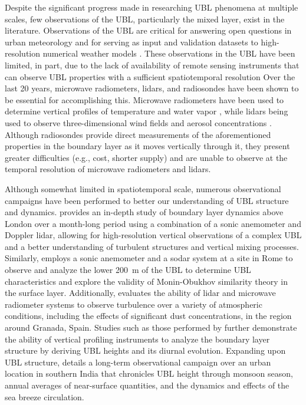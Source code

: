 \documentclass[11pt,a4paper]{article}
\begin{document}
Despite the significant progress made in researching UBL phenomena at multiple scales, few observations of the UBL, particularly the mixed layer, exist in the literature. Observations of the UBL are critical for answering open questions in urban meteorology and for serving as input and validation datasets to high-resolution numerical weather models \citep{barlow2014, best2005, edwards2020, leroyer2014, ronda2017}. These observations in the UBL have been limited, in part, due to the lack of availability of remote sensing instruments that can observe UBL properties with a sufficient spatiotemporal resolution \citep{barlow2014, davis2021, roth2000, zhang2020} Over the last 20 years, microwave radiometers, lidars, and radiosondes have been shown to be essential for accomplishing this. Microwave radiometers have been used to determine vertical profiles of temperature and water vapor \citep{rose2005, wang2012}, while lidars being used to observe three-dimensional wind fields and aerosol concentrations \citep{grund2001}. Although radiosondes provide direct measurements of the aforementioned properties in the boundary layer as it moves vertically through it, they present greater difficulties (e.g., cost, shorter supply) and are unable to observe at the temporal resolution of microwave radiometers and lidars. 

Although somewhat limited in spatiotemporal scale, numerous observational campaigns have been performed to better our understanding of UBL structure and dynamics. \citet{barlow2011} provides an in-depth study of boundary layer dynamics above London over a month-long period using a combination of a sonic anemometer and Doppler lidar, allowing for high-resolution vertical observations of a complex UBL and a better understanding of turbulent structures and vertical mixing processes. Similarly, \citet{pelliccioni2012} employs a sonic anemometer and a sodar system at a site in Rome to observe and analyze the lower \SI{200}{\meter} of the UBL to determine UBL characteristics and explore the validity of Monin-Obukhov similarity theory in the surface layer. Additionally, \citet{dearrudamoreira2020} evaluates the ability of lidar and microwave radiometer systems to observe turbulence over a variety of atmospheric conditions, including the effects of significant dust concentrations, in the region around Granada, Spain. Studies such as those performed by \citet{banks2015, quan2013, wang2012} further demonstrate the ability of vertical profiling instruments to analyze the boundary layer structure by deriving UBL heights and its diurnal evolution. Expanding upon UBL structure, \citet{anurose2018} details a long-term observational campaign over an urban location in southern India that chronicles UBL height through monsoon season, annual averages of near-surface quantities, and the dynamics and effects of the sea breeze circulation. 
\end{document}
